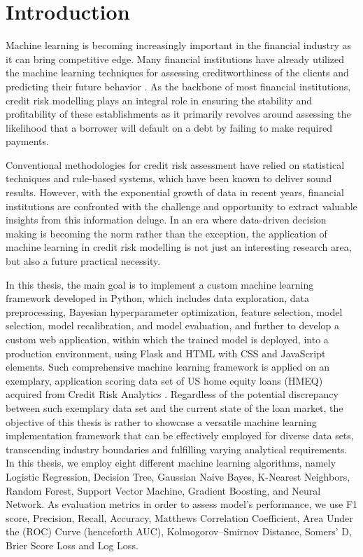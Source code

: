 \chapter{Introduction}
\label{chap:one}


Machine learning is becoming increasingly important in the financial industry as it can bring competitive edge. Many financial institutions have already utilized the machine learning techniques for assessing creditworthiness of the clients and predicting their future behavior \citep{PwC2023}.
As the backbone of most financial institutions, credit risk modelling plays an integral role in ensuring the stability and profitability of these establishments as it primarily revolves around assessing the likelihood that a borrower will default on a debt by failing to make required payments.

Conventional methodologies for credit risk assessment have relied on statistical techniques and rule-based systems, which have been known to deliver sound results.
However, with the exponential growth of data in recent years, financial institutions are confronted with the challenge and opportunity to extract valuable insights from this information deluge.
In an era where data-driven decision making is becoming the norm rather than the exception, the application of machine learning in credit risk modelling is not just an interesting research area, but also a future practical necessity.

In this thesis, the main goal is to implement a custom machine learning framework developed in Python, which includes data exploration, data preprocessing, Bayesian hyperparameter optimization, feature selection, model selection, model recalibration, and model evaluation, and further to develop a custom web application, within which the trained model is deployed, into a production environment, using Flask and HTML with CSS and JavaScript elements.
Such comprehensive machine learning framework is applied on an exemplary, application scoring data set of US home equity loans (HMEQ) acquired from Credit Risk Analytics \citep{baesens2016credit}.
Regardless of the potential discrepancy between such exemplary data set and the current state of the loan market, the objective of this thesis is rather to showcase a versatile machine learning implementation framework that can be effectively employed for diverse data sets, transcending industry boundaries and fulfilling varying analytical requirements.
In this thesis, we employ eight different machine learning algorithms, namely Logistic Regression, Decision Tree, Gaussian Naive Bayes, K-Nearest Neighbors, Random Forest, Support Vector Machine, Gradient Boosting, and Neural Network.
As evaluation metrics in order to assess model's performance, we use F1 score, Precision, Recall, Accuracy, Matthews Correlation Coefficient, Area Under the (ROC) Curve (henceforth AUC), Kolmogorov--Smirnov Distance, Somers' D, Brier Score Loss and Log Loss.

